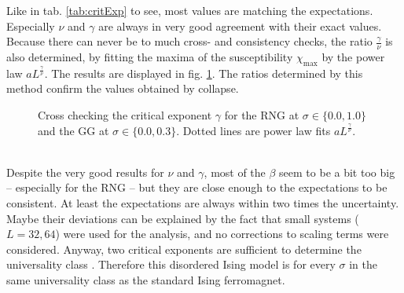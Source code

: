     Like in tab. \ref{tab:critExp} to see, most values
    are matching the expectations. Especially \(\nu\) and \(\gamma\)
    are always in very good agreement with their exact values. Because
    there can never be to much cross- and consistency checks, the ratio
    \(\frac{\gamma}{\nu}\) is also determined, by fitting the maxima of
    the susceptibility \(\chi_{\mathrm{max}}\) by the power law \(aL^\frac{\gamma}{\nu}\).
    The results are displayed in fig. \ref{fig:susCrossCheck}. The ratios
    determined by this method confirm the values obtained by collapse.
    \begin{figure}[htbp]
        \centering
        \caption[Alternative Way Determining $\gamma$]
        {
            Cross checking the critical exponent $\gamma$ for
                 the RNG at $\sigma \in \{0.0, 1.0\}$ and
                 the GG at $\sigma \in \{0.0, 0.3\}$.
            Dotted lines are power law fits \(aL^\frac{\gamma}{\nu}\).
        }
        \label{fig:susCrossCheck}
    \end{figure}\\
    Despite the very good results for \(\nu\) and \(\gamma\), most of the
    \(\beta\) seem to be a bit too big -- especially for the RNG -- but
    they are close enough to the expectations to be consistent. At least
    the expectations are always within two times the uncertainty.
    Maybe their deviations can be explained by the fact that small
    systems (\(L=32,64\)) were used for the analysis, and no corrections
    to scaling terms were considered.
    Anyway, two critical exponents are sufficient to determine the
    universality class \cite[p. 145]{Katzgraber2011}. Therefore this
    disordered Ising model is for every \(\sigma\) in the same universality
    class as the standard Ising ferromagnet.

